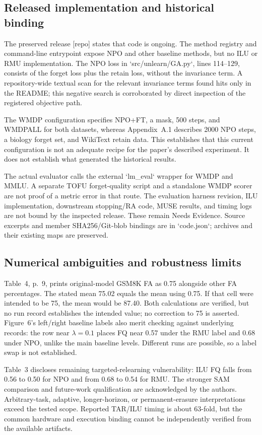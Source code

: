 \documentclass[10pt]{article}
\begin{document}
\subsection*{Released implementation and historical binding}
The preserved release [repo] states that code is ongoing. The method registry and command-line entrypoint expose NPO and other baseline methods, but no ILU or RMU implementation. The NPO loss in `src/unlearn/GA.py`, lines 114–129, consists of the forget loss plus the retain loss, without the invariance term. A repository-wide textual scan for the relevant invariance terms found hits only in the README; this negative search is corroborated by direct inspection of the registered objective path.\par
The WMDP configuration specifies NPO+FT, a mask, 500 steps, and WMDPALL for both datasets, whereas Appendix A.1 describes 2000 NPO steps, a biology forget set, and WikiText retain data. This establishes that this current configuration is not an adequate recipe for the paper’s described experiment. It does not establish what generated the historical results.\par
The actual evaluator calls the external `lm\_eval` wrapper for WMDP and MMLU. A separate TOFU forget-quality script and a standalone WMDP scorer are not proof of a metric error in that route. The evaluation harness revision, ILU implementation, downstream stopping/RA code, MUSE results, and timing logs are not bound by the inspected release. These remain Needs Evidence. Source excerpts and member SHA256/Git-blob bindings are in `code.json`; archives and their existing maps are preserved.\par
\subsection*{Numerical ambiguities and robustness limits}
Table 4, p. 9, prints original-model GSM8K FA as 0.75 alongside other FA percentages. The stated mean 75.02 equals the mean using 0.75. If that cell were intended to be 75, the mean would be 87.40. Both calculations are verified, but no run record establishes the intended value; no correction to 75 is asserted. Figure 6’s left/right baseline labels also merit checking against underlying records: the row near \(\lambda=0.1\) places FQ near 0.57 under the RMU label and 0.68 under NPO, unlike the main baseline levels. Different runs are possible, so a label swap is not established.\par
Table 3 discloses remaining targeted-relearning vulnerability: ILU FQ falls from 0.56 to 0.50 for NPO and from 0.68 to 0.54 for RMU. The stronger SAM comparison and future-work qualification are acknowledged by the authors. Arbitrary-task, adaptive, longer-horizon, or permanent-erasure interpretations exceed the tested scope. Reported TAR/ILU timing is about 63-fold, but the common hardware and execution binding cannot be independently verified from the available artifacts.\par
\end{document}
